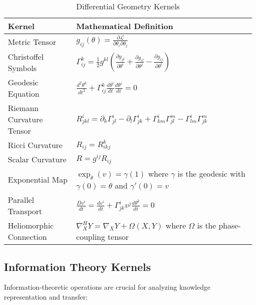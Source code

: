 \begin{table}[h]
\centering
\small
\caption{Differential Geometry Kernels}
\label{tab:geometry_kernels}
\begin{tabular}{|p{5cm}|p{9cm}|}
\hline
\textbf{Kernel} & \textbf{Mathematical Definition} \\
\hline
Metric Tensor & $g_{ij}(\theta) = \frac{\partial \mathcal{L}}{\partial \theta_i \partial \theta_j}$ \\
\hline
Christoffel Symbols & $\Gamma^k_{ij} = \frac{1}{2}g^{kl}\left(\frac{\partial g_{jl}}{\partial \theta^i} + \frac{\partial g_{il}}{\partial \theta^j} - \frac{\partial g_{ij}}{\partial \theta^l}\right)$ \\
\hline
Geodesic Equation & $\frac{d^2\theta^k}{dt^2} + \Gamma^k_{ij}\frac{d\theta^i}{dt}\frac{d\theta^j}{dt} = 0$ \\
\hline
Riemann Curvature Tensor & $R^i_{jkl} = \partial_k\Gamma^i_{jl} - \partial_l\Gamma^i_{jk} + \Gamma^i_{km}\Gamma^m_{jl} - \Gamma^i_{lm}\Gamma^m_{jk}$ \\
\hline
Ricci Curvature & $R_{ij} = R^k_{ikj}$ \\
\hline
Scalar Curvature & $R = g^{ij}R_{ij}$ \\
\hline
Exponential Map & $\exp_{\theta}(v) = \gamma(1)$ where $\gamma$ is the geodesic with $\gamma(0) = \theta$ and $\gamma'(0) = v$ \\
\hline
Parallel Transport & $\frac{D v^i}{dt} = \frac{dv^i}{dt} + \Gamma^i_{jk}v^j\frac{d\theta^k}{dt} = 0$ \\
\hline
Heliomorphic Connection & $\nabla^H_X Y = \nabla_X Y + \Omega(X, Y)$ where $\Omega$ is the phase-coupling tensor \\
\hline
\end{tabular}
\end{table}

\subsection{Information Theory Kernels}

Information-theoretic operations are crucial for analyzing knowledge representation and transfer:

